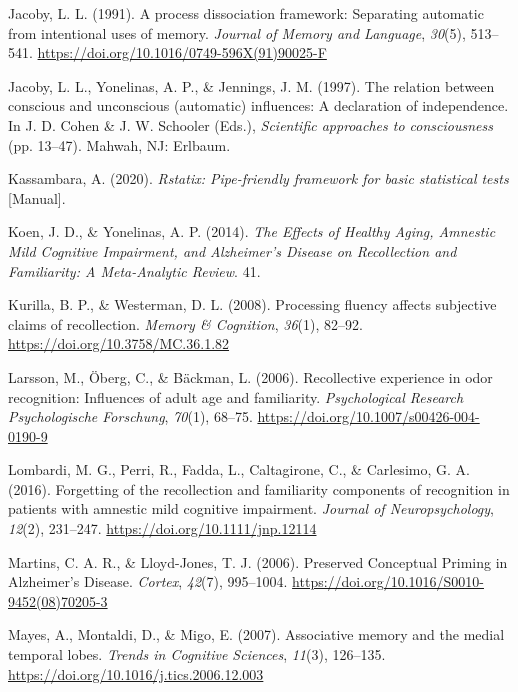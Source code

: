 \documentclass[
  11pt,
]{article}
\begin{document}
\leavevmode\hypertarget{ref-jacoby1991}{}%
Jacoby, L. L. (1991). A process dissociation framework: Separating
automatic from intentional uses of memory. \emph{Journal of Memory and
Language}, \emph{30}(5), 513--541.
\url{https://doi.org/10.1016/0749-596X(91)90025-F}

\leavevmode\hypertarget{ref-jacoby1997}{}%
Jacoby, L. L., Yonelinas, A. P., \& Jennings, J. M. (1997). The relation
between conscious and unconscious (automatic) influences: A declaration
of independence. In J. D. Cohen \& J. W. Schooler (Eds.),
\emph{Scientific approaches to consciousness} (pp. 13--47). Mahwah, NJ:
Erlbaum.

\leavevmode\hypertarget{ref-rstatix}{}%
Kassambara, A. (2020). \emph{Rstatix: Pipe-friendly framework for basic
statistical tests} {[}Manual{]}.

\leavevmode\hypertarget{ref-koen2014}{}%
Koen, J. D., \& Yonelinas, A. P. (2014). \emph{The Effects of Healthy
Aging, Amnestic Mild Cognitive Impairment, and Alzheimer's Disease on
Recollection and Familiarity: A Meta-Analytic Review}. 41.

\leavevmode\hypertarget{ref-kurilla2008}{}%
Kurilla, B. P., \& Westerman, D. L. (2008). Processing fluency affects
subjective claims of recollection. \emph{Memory \& Cognition},
\emph{36}(1), 82--92. \url{https://doi.org/10.3758/MC.36.1.82}

\leavevmode\hypertarget{ref-larsson2006}{}%
Larsson, M., Öberg, C., \& Bäckman, L. (2006). Recollective experience
in odor recognition: Influences of adult age and familiarity.
\emph{Psychological Research Psychologische Forschung}, \emph{70}(1),
68--75. \url{https://doi.org/10.1007/s00426-004-0190-9}

\leavevmode\hypertarget{ref-lombardi2016}{}%
Lombardi, M. G., Perri, R., Fadda, L., Caltagirone, C., \& Carlesimo, G.
A. (2016). Forgetting of the recollection and familiarity components of
recognition in patients with amnestic mild cognitive impairment.
\emph{Journal of Neuropsychology}, \emph{12}(2), 231--247.
\url{https://doi.org/10.1111/jnp.12114}

\leavevmode\hypertarget{ref-martins2006}{}%
Martins, C. A. R., \& Lloyd-Jones, T. J. (2006). Preserved Conceptual
Priming in Alzheimer's Disease. \emph{Cortex}, \emph{42}(7), 995--1004.
\url{https://doi.org/10.1016/S0010-9452(08)70205-3}

\leavevmode\hypertarget{ref-mayes2007}{}%
Mayes, A., Montaldi, D., \& Migo, E. (2007). Associative memory and the
medial temporal lobes. \emph{Trends in Cognitive Sciences},
\emph{11}(3), 126--135. \url{https://doi.org/10.1016/j.tics.2006.12.003}
\end{document}
